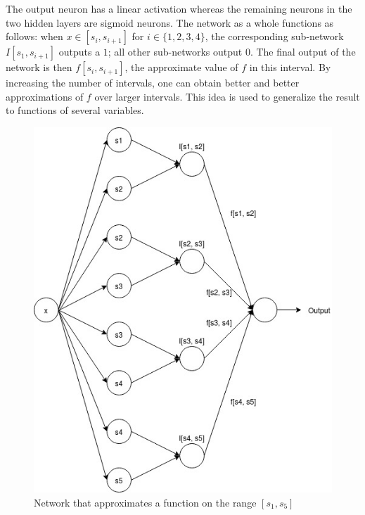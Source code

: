 The output neuron has a linear activation whereas the remaining neurons in the two 
hidden layers are sigmoid neurons. The network as a whole functions as follows: 
when $x \in [s_i, s_{i + 1}]$ for $i \in \{1, 2, 3, 4\}$, the corresponding sub-network 
$I[s_1, s_{i + 1}]$ outputs a $1$; all other sub-networks output $0$. The final output
of the network is then $f[s_i, s_{i + 1}]$, the approximate value of $f$ in this interval. 
By increasing the number of intervals, one can obtain better and better approximations 
of $f$ over larger intervals. This idea is used to generalize the result to 
functions of several variables. 

\begin{figure}[ht]
\begin{center}
\includegraphics[scale=0.5]{OneVariableFunctions.jpg}
\end{center}
\caption{Network that approximates a function on the range $[s_1, s_5]$}
\label{fig:one_variable_function}
\end{figure}

